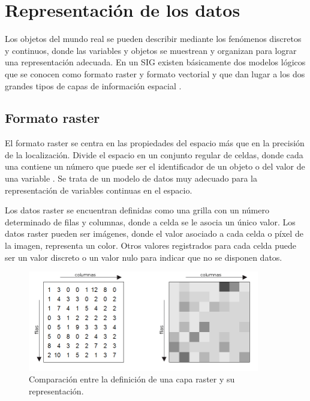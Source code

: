 \section{Representación de los datos }
\label{sec:cap2-tecnicas-graficas-representacion}
Los objetos del mundo real se pueden describir mediante los fenómenos discretos y continuos, donde las variables y objetos se muestrean y organizan para lograr una representación adecuada. En un
SIG existen básicamente dos modelos lógicos que se conocen como formato raster y formato vectorial
y que dan lugar a los dos grandes tipos de capas de información espacial \citep{fAlonsoSig2006}.

\subsection{Formato raster}
El formato raster se centra en las propiedades del espacio más que en la precisión de la
localización. Divide el espacio en un conjunto regular de celdas, donde cada una contiene un
número que puede ser el identificador de un objeto o del valor de una variable
\citep{fAlonsoSig2006}. Se trata de un modelo de datos muy adecuado para la representación de
variables continuas en el espacio.

Los datos raster se encuentran definidas como una grilla con un número determinado de filas y
columnas, donde a celda se le asocia un único valor. Los datos raster pueden ser imágenes, donde
el valor asociado a cada celda o píxel de la imagen, representa un color. Otros valores
registrados para cada celda puede ser un valor discreto o un valor nulo para indicar que no se
disponen datos.

\begin{figure}[H]
\centering
\includegraphics[width=0.9\textwidth]{capitulo-2/graphics/representacion-raster.png}
\caption{\label{fig:sig-capa-raster} Comparación entre la definición de una capa raster y su representación. }
\end{figure}

